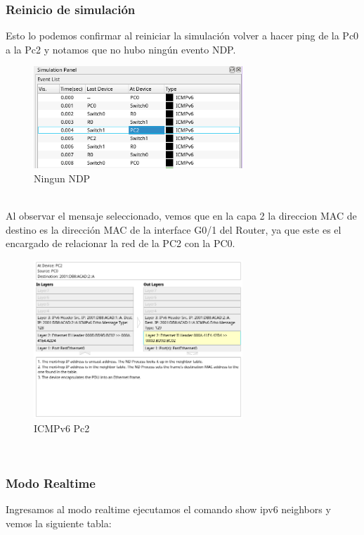 \documentclass[a4paper,12pt]{article}
\begin{document}
\subsubsection{Reinicio de simulación}
Esto lo podemos confirmar al reiniciar la simulación volver a hacer ping de la Pc0 a la Pc2 y notamos que no hubo ningún evento NDP. \\
\begin{figure}[h]
    \centering
    \includegraphics[width=0.7\textwidth]{imagenes/6.png}
    \caption{Ningun NDP}
\end{figure}\\
\FloatBarrier
Al observar el mensaje seleccionado, vemos que en la capa 2 la direccion MAC de destino es la dirección MAC de la interface G0/1 del Router, ya que este es el encargado de relacionar la red de la PC2 con la PC0.
\begin{figure}[h]
    \centering
    \includegraphics[width=0.7\textwidth]{imagenes/7.png}
    \caption{ICMPv6 Pc2}
\end{figure}\\
\FloatBarrier
\subsubsection{Modo Realtime}
Ingresamos al modo realtime ejecutamos el comando show ipv6 neighbors y vemos la siguiente tabla:\\
\end{document}
